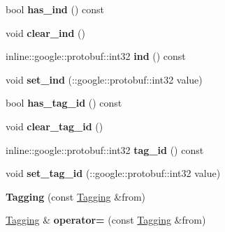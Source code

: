 \begin{DoxyCompactItemize}
\item 
\hypertarget{classTagging_a7e57b22b3a2162e380feae08233ee3a9}{
bool {\bfseries has\_\-ind} () const }
\label{classTagging_a7e57b22b3a2162e380feae08233ee3a9}

\item 
\hypertarget{classTagging_ad56efb939f57d519f4585a537c3d5266}{
void {\bfseries clear\_\-ind} ()}
\label{classTagging_ad56efb939f57d519f4585a537c3d5266}

\item 
\hypertarget{classTagging_ae6654e503f1906c0265012e311545c27}{
inline::google::protobuf::int32 {\bfseries ind} () const }
\label{classTagging_ae6654e503f1906c0265012e311545c27}

\item 
\hypertarget{classTagging_a34538a14f1727c2c15ddf43f5419f61b}{
void {\bfseries set\_\-ind} (::google::protobuf::int32 value)}
\label{classTagging_a34538a14f1727c2c15ddf43f5419f61b}

\item 
\hypertarget{classTagging_a8ef6eb12fffbe4fbd1b1fc622fc4fb87}{
bool {\bfseries has\_\-tag\_\-id} () const }
\label{classTagging_a8ef6eb12fffbe4fbd1b1fc622fc4fb87}

\item 
\hypertarget{classTagging_a25056abd232cdf45b153cb4b02b82dc2}{
void {\bfseries clear\_\-tag\_\-id} ()}
\label{classTagging_a25056abd232cdf45b153cb4b02b82dc2}

\item 
\hypertarget{classTagging_aa65105a209336790f3faf174b6e47813}{
inline::google::protobuf::int32 {\bfseries tag\_\-id} () const }
\label{classTagging_aa65105a209336790f3faf174b6e47813}

\item 
\hypertarget{classTagging_a44fc9490ab405218c27f13fa056b2ff5}{
void {\bfseries set\_\-tag\_\-id} (::google::protobuf::int32 value)}
\label{classTagging_a44fc9490ab405218c27f13fa056b2ff5}

\item 
\hypertarget{classTagging_a3236d0c0080d7f797f080151e66b756e}{
{\bfseries Tagging} (const \hyperlink{classTagging}{Tagging} \&from)}
\label{classTagging_a3236d0c0080d7f797f080151e66b756e}

\item 
\hypertarget{classTagging_ab21cdd0216e66fb17a8319c5f4b1a4d6}{
\hyperlink{classTagging}{Tagging} \& {\bfseries operator=} (const \hyperlink{classTagging}{Tagging} \&from)}
\label{classTagging_ab21cdd0216e66fb17a8319c5f4b1a4d6}


\end{DoxyCompactItemize}
